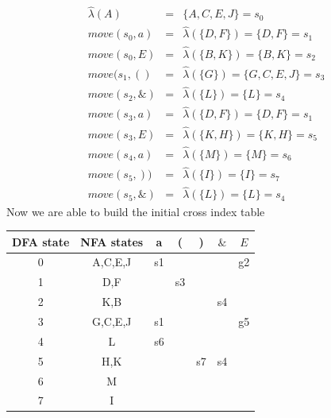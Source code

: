 \documentclass[11pt,a4paper]{article}
\begin{document}
$$
\begin{array}{lcl}
    \hat{\lambda} (A) & = & \{A,C,E,J\} = s_{0}\\
    move(s_{0},a)   & = & \hat{\lambda} (\{D, F \})     = \{D, F\}          = s_{1} \\
    move(s_{0},E)   & = & \hat{\lambda} (\{B, K \})     = \{B, K\}          = s_{2} \\
    move(s_{1},()   & = & \hat{\lambda} (\{G \})        = \{G, C, E, J\}    = s_{3} \\
    move(s_{2},\&)  & = & \hat{\lambda} (\{L \})        = \{L \}            = s_{4} \\
    move(s_{3},a)   & = & \hat{\lambda} (\{D, F\})      = \{D , F \}        = s_{1} \\
    move(s_{3},E)   & = & \hat{\lambda} (\{K, H \})     = \{K, H\}          = s_{5} \\
    move(s_{4},a)   & = & \hat{\lambda} (\{M \})        = \{M\}             = s_{6} \\
    move(s_{5},))   & = & \hat{\lambda} (\{I \})        = \{I\}             = s_{7} \\
    move(s_{5},\&)  & = & \hat{\lambda} (\{L \})        = \{L\}             = s_{4}
\end{array}
$$
Now we are able to build the initial cross index table
\begin{center}
    \begin{tabular}{c|c|c c c c|c}
        DFA state   & NFA states    & a     & (     & )     & $\&$  & $E$  \\ \hline
        0           & A,C,E,J       & s1    &       &       &       & g2  \\      
        1           & D,F           &       & s3    &       &       & \\      
        2           & K,B           &       &       &       & s4    & \\      
        3           & G,C,E,J       & s1    &       &       &       & g5 \\      
        4           & L             & s6    &       &       &       & \\      
        5           & H,K           &       &       & s7    & s4    & \\      
        6           & M             &       &       &       &       & \\      
        7           & I             &       &       &       &       & \\      
    \end{tabular}
\end{center}
\end{document}
